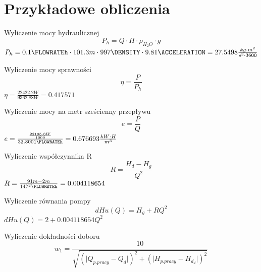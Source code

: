 \section{Przykładowe obliczenia}

\begin{flushleft}
    Wyliczenie mocy hydraulicznej
    \begin{equation}
        P_h=Q\cdot H\cdot \rho_{H_2O}\cdot g 
    \end{equation}
    \centering
    \(P_h=0.1\FLOWRATEh\cdot 101.3m \cdot 997 \DENSITY \cdot 9.81 \ACCELERATION = 27.5498 \frac{kg\cdot m^2}{s^3 \cdot 3600}\)
\end{flushleft} 

\begin{flushleft}
    Wyliczenie mocy sprawności
    \begin{equation}
        \eta = \frac{P}{P_h} 
    \end{equation}
    \centering
    \(\eta = \frac{22422.2 W}{9362.88 W}=0.417571\)
\end{flushleft} 

\begin{flushleft}
    Wyliczenie mocy na metr sześcienny przepływu
    \begin{equation}
        e=\frac{P}{Q} 
    \end{equation}
    \centering
    \(e=\frac{\frac{22195.6 W}{1000}}{32.8001\FLOWRATEh} =0.676693\frac{kW\cdot H}{m^3}\)
\end{flushleft} 

\begin{flushleft}
    Wyliczenie współczynnika R
    \begin{equation}
        R=\frac{H_d-H_g}{Q^2}
    \end{equation}
    \centering
    \(R=\frac{91 m - 2 m}{147^2\FLOWRATEh}=0.004118654\)
\end{flushleft}

\begin{flushleft}
    Wyliczenie równania pompy
    \begin{equation}
        dHu(Q)=H_g+RQ^2
    \end{equation}
    \centering
    \(dHu(Q)=2+ 0.004118654 Q^2\)
\end{flushleft} 

\begin{flushleft}
    Wyliczenie dokładności doboru
    \begin{equation}
        w_1=\frac{10}{\sqrt{\left(\lvert Q_{p.pracy}-Q_d\rvert\right)^2+\left(\lvert H_{p.pracy}-H_{d_d}\rvert\right)^2}}
    \end{equation}
\end{flushleft} 

